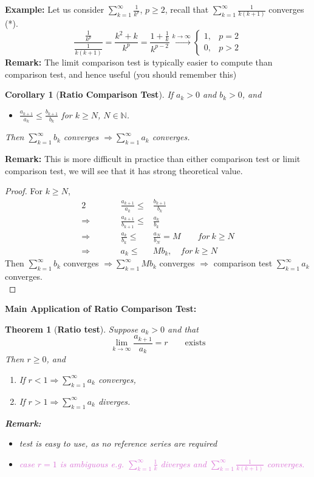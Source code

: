 \documentclass[12pt]{article}
\theoremstyle{plain}
\newtheorem{theorem}{Theorem}[subsection]
\newtheorem{corollary}{Corollary}[subsection]
\newcommand{\mN}{{\mathbb{N}}}
\begin{document}
{\color{Brown}
\textbf{Example: }
Let us consider $\sum_{k=1}^{\infty} \frac1{k^p}$, $p \geq 2$, recall that
$\sum_{k=1}^{\infty} \frac1{k(k+1)}$ converges (*). 
\[
	\frac{\frac 1{k^p}}{\frac{1}{k(k+1)}} 
	=\frac{k^2+k}{k^p} 
	=\frac{1+\frac 1k}{k^{p-2}} \overset{k\to\infty}{\rightarrow}
	\begin{cases}
		1,	& p = 2	\\
		0,	& p > 2
	\end{cases}
\]
}
\textbf{Remark: }The limit comparison test is typically easier to compute than
comparison test, and hence useful (you should remember this)\\


\begin{corollary}[\textbf{Ratio Comparison Test}]
	If $a_k > 0$ and $b_k > 0$, and 
	\begin{itemize}
		\item $\frac{a_{k+1}}{a_k} \leq \frac{b_{k+1}}{b_k}$ for 
			$k \geq N$, $N \in \mN$. 
	\end{itemize}
	Then $\sum_{k=1}^{\infty}b_k$ converges $\Rightarrow \sum_{k=1}^{\infty}
	a_k$ converges. 
\end{corollary}
\textbf{Remark:} This is more difficult in practice than either comparison
test or limit comparison test, we will see that it has strong theoretical value.
\begin{proof}
	For $k \geq N$, 
	\begin{alignat*}{2}
		& & \frac{a_{k+1}}{a_k} \leq& \frac{b_{k+1}}{b_k}		\\
		\Rightarrow & \qquad & \frac{a_{k+1}}{b_{k+1}} \leq&\frac{a_k}{b_k}	\\
		\Rightarrow & \qquad & \frac{a_k}{b_k} \leq &\frac{a_N}{b_N} = M
		\qquad for \ k \geq N	\\
		\Rightarrow & \qquad & a_k \leq& Mb_k, \quad for\ k \geq N
	\end{alignat*}
	Then $\sum_{k=1}^{\infty} b_k$ converges 
	$\Rightarrow \sum_{k=1}^{\infty} Mb_k$ converges $\Rightarrow$ 
	comparison test $\sum_{k=1}^{\infty} a_k$ converges.	\\
\end{proof}

\textbf{Main Application of Ratio Comparison Test: }
\begin{theorem}[\textbf{Ratio test}]
	Suppose $a_k > 0$ and that 
	\[
		\lim_{k\to\infty} \frac{a_{k+1}}{a_k} = r \qquad \text{exists}
	\]
	Then $r \geq 0$, and 
	\begin{enumerate}
		\item If $r < 1 \Rightarrow \sum_{k=1}^{\infty} a_k$ converges,
		\item If $r > 1 \Rightarrow \sum_{k=1}^{\infty} a_k$ diverges.  
	\end{enumerate}
	\textbf{Remark:}
	\begin{itemize}
		\item test is easy to use, as no reference series are required
		\item \textcolor{Orchid}{case $r=1$ is ambiguous
			e.g. $\sum_{k=1}^{\infty} \frac1{k}$ diverges and 
		$\sum_{k=1}^{\infty} \frac1{k(k+1)}$ converges.} 
	\end{itemize}
\end{theorem}
\end{document}
